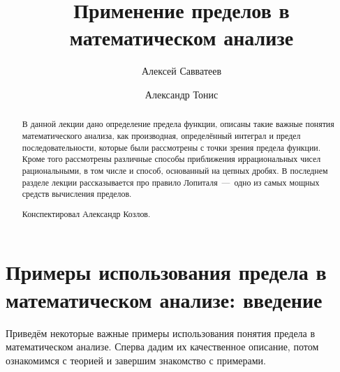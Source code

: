 \documentclass[12pt]{article}
\title{Применение пределов в математическом анализе}
\author{Алексей Савватеев \and Александр Тонис}
\begin{document}
\maketitle
\begin{abstract}
В данной лекции дано определение предела функции, описаны такие важные понятия математического анализа, как производная, определённый интеграл и предел последовательности, которые были рассмотрены с точки зрения предела функции. Кроме того рассмотрены различные способы приближения иррациональных чисел рациональными, в том числе и способ, основанный на цепных дробях. В последнем разделе лекции рассказывается про правило Лопиталя~\----~одно из самых мощных средств вычисления пределов.
\par
Конспектировал Александр Козлов. 
\end{abstract}
\newpage
\tableofcontents
\newpage
\section{Примеры использования предела в математическом анализе: введение}
Приведём некоторые важные примеры использования понятия предела в математическом анализе. Сперва дадим их качественное описание, потом ознакомимся с теорией и завершим знакомство с примерами.
\end{document}
